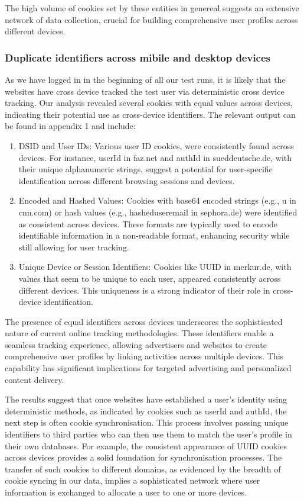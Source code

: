 The high volume of cookies set by these entities in genereal suggests an extensive network of data collection, crucial for building comprehensive user profiles across different devices.


\subsubsection{Duplicate identifiers across mibile and desktop devices}
As we have logged in in the beginning of all our test runs, it is likely that the websites have cross device tracked the test user via deterministic cross device tracking. Our analysis revealed several cookies with equal values across devices, indicating their potential use as cross-device identifiers. The relevant output can be found in appendix 1 and include:
\begin{enumerate}
    \item DSID and User IDs: Various user ID cookies, were consistently found across devices. For instance, userId in faz.net and authId in sueddeutsche.de, with their unique alphanumeric strings, suggest a potential for user-specific identification across different browsing sessions and devices.
    \item Encoded and Hashed Values: Cookies with base64 encoded strings (e.g., u in cnn.com) or hash values (e.g., hasheduseremail in sephora.de) were identified as consistent across devices. These formats are typically used to encode identifiable information in a non-readable format, enhancing security while still allowing for user tracking.
    \item Unique Device or Session Identifiers: Cookies like UUID in merkur.de, with values that seem to be unique to each user, appeared consistently across different devices. This uniqueness is a strong indicator of their role in cross-device identification.
\end{enumerate}
The presence of equal identifiers across devices underscores the sophisticated nature of current online tracking methodologies. These identifiers enable a seamless tracking experience, allowing advertisers and websites to create comprehensive user profiles by linking activities across multiple devices. This capability has significant implications for targeted advertising and personalized content delivery.

The results suggest that once websites have established a user's identity using deterministic methods, as indicated by cookies such as userId and authId, the next step is often cookie synchronisation. This process involves passing unique identifiers to third parties who can then use them to match the user's profile in their own databases. For example, the consistent appearance of UUID cookies across devices provides a solid foundation for synchronisation processes. The transfer of such cookies to different domains, as evidenced by the breadth of cookie syncing in our data, implies a sophisticated network where user information is exchanged to allocate a user to one or more devices.

